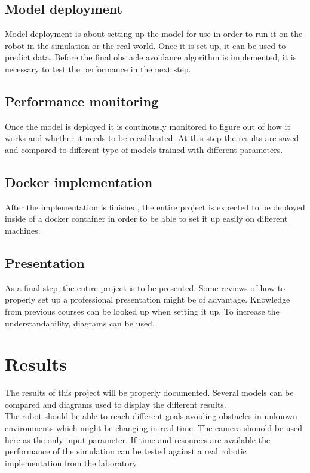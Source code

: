 \documentclass[a4paper,11pt,singlespacing]{article}
\begin{document}
\subsection{Model deployment}
Model deployment is about setting up the model for use in order to run it on the robot in the simulation or the real world. Once it is set up, it can be used to predict data. Before the final obstacle avoidance algorithm is implemented, it is necessary to test the performance in the next step.

\subsection{Performance monitoring}
Once the model is deployed it is continously monitored to figure out of how it works and whether it needs to be recalibrated. At this step the results are saved and compared to different type of models trained with different parameters. 

\subsection{Docker implementation}
After the implementation is finished, the entire project is expected to be deployed inside of a docker container in order to be able to set it up easily on different machines.

\subsection{Presentation}
As a final step, the entire project is to be presented. Some reviews of how to properly set up a professional presentation might be of advantage. Knowledge from previous courses can be looked up when setting it up. To increase the understandability, diagrams can be used.

\newpage
\section{Results}
The results of this project will be properly documented. Several models can be compared and diagrams used to display the different results.\\

The robot should be able to reach different goals,avoiding obstacles in unknown environments which might be changing in real time. The camera shouold be used here as the only input parameter. If time and resources are available the performance of the simulation can be tested against a real robotic implementation from the laboratory

\printbibliography[heading=bibintoc]
\end{document}
